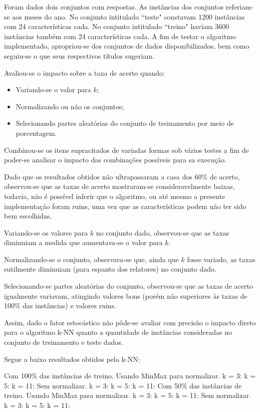 \documentclass[12pt]{article}
\begin{document}
		Foram dados dois conjuntos com respostas. As instâncias dos conjuntos referiam-se aos meses do ano. No conjunto intitulado ``teste" constavam 1200 instâncias com 24 características cada. No conjunto intitulado ``treino" haviam 3600 instâncias também com 24 características cada. A fim de testar o algoritmo implementado, apropriou-se dos conjuntos de dados disponibilizados, bem como seguiu-se o que seus respectivos títulos sugeriam.

		Avaliou-se o impacto sobre a taxa de acerto quando:

		\begin{itemize}
			\item Variando-se o valor para $k$;
			\item Normalizando ou não os conjuntos;
			\item Selecionando partes aleatórias do conjunto de treinamento por meio de porcentagem.
		\end{itemize}

		Combinou-se os itens supracitados de variadas formas sob vários testes a fim de poder-se analisar o impacto das combinações possíveis para sa execução.
		
		Dado que os resultados obtidos não ultrapassaram a casa dos 60\% de acerto, observou-se que as taxas de acerto 
		mostraram-se consideravelmente baixas, todavia, não é possível inferir que o algoritmo, ou até mesmo a presente implementação foram ruins, uma vez que as características podem não ter sido bem escolhidas.

		Variando-se os valores para $k$ no conjunto dado, observou-se que as taxas diminuiam a medida que aumentava-se o valor para $k$.

		Normalizando-se o conjunto, observava-se que, ainda que $k$ fosse variado, as taxas sutilmente diminuiam (para espanto dos relatores) no conjunto dado.

		Selecionando-se partes aleatórias do conjunto, observou-se que as taxas de acerto igualmente variavam, atingindo valores bons (porém não superiores às taxas de 100\% das instâncias) e valores ruins.

		Assim, dado o fator estocástico não pôde-se avaliar com precisão o impacto direto para o algoritmo k-NN quanto a quantidade de instâncias consideradas no conjunto de treinamento e teste dados.

		Segue a baixo resultados obtidos pelo k-NN:

		Com 100\% das instâncias de treino.
			Usando MinMax para normalizar.
				k = 3:
				k = 5:
				k = 11:
			Sem normalizar.
				k = 3:
				k = 5:
				k = 11:
		Com 50\% das instâncias de treino.
			Usando MinMax para normalizar.
				k = 3:
				k = 5:
				k = 11:
			Sem normalizar.
				k = 3:
				k = 5:
				k = 11:
\end{document}
